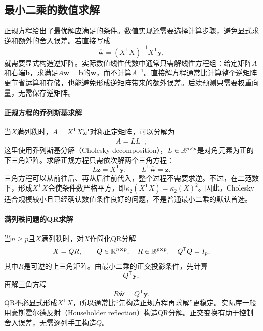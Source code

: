 \subsection{最小二乘的数值求解}
正规方程给出了最优解应满足的条件。数值实现还需要选择计算步骤，避免显式求逆和额外的舍入误差。若直接写成
\begin{equation}
 \hat{\bm w}=(X^{\mathsf T}X)^{-1}X^{\mathsf T}\bm y,
\end{equation}
就需要显式构造逆矩阵。实际数值线性代数中通常只需解线性方程组：给定矩阵$A$和右端$\bm b$，求满足$A\bm w=\bm b$的$\bm w$，而不计算$A^{-1}$。直接解方程通常比计算整个逆矩阵更节省运算和存储，也能避免形成逆矩阵带来的额外误差。后续预测只需要权重向量，无需保存逆矩阵。

\paragraph{正规方程的乔列斯基求解}
当$X$满列秩时，$A=X^{\mathsf T}X$是对称正定矩阵，可以分解为
\begin{equation}
 A=LL^{\mathsf T},
\end{equation}
这里使用乔列斯基分解（Cholesky decomposition），$L\in\mathbb{R}^{p\times p}$是对角元素为正的下三角矩阵。求解正规方程只需依次解两个三角方程：
\begin{equation}
 L\bm z=X^{\mathsf T}\bm y,
 \qquad
 L^{\mathsf T}\hat{\bm w}=\bm z.
\end{equation}
三角方程可以从前往后、再从后往前代入，整个过程不需要求逆。不过，在二范数下，形成$X^{\mathsf T}X$会使条件数严格平方，即$\kappa_2(X^{\mathsf T}X)=\kappa_2(X)^2$。因此，Cholesky适合规模较小且已经确认数值条件良好的问题，不是普通最小二乘的默认首选。

\paragraph{满列秩问题的QR求解}
当$n\geq p$且$X$满列秩时，对$X$作简化QR分解
\begin{equation}
 X=QR,
 \qquad Q\in\mathbb{R}^{n\times p},\quad R\in\mathbb{R}^{p\times p},\quad Q^{\mathsf T}Q=I_p,
\end{equation}
其中$R$是可逆的上三角矩阵。由最小二乘的正交投影条件，先计算
\begin{equation}
 Q^{\mathsf T}\bm y,
\end{equation}
再解三角方程
\begin{equation}
 R\hat{\bm w}=Q^{\mathsf T}\bm y.
\end{equation}
QR不必显式形成$X^{\mathsf T}X$，所以通常比“先构造正规方程再求解”更稳定。实际库一般用豪斯霍尔德反射（Householder reflection）构造QR分解。正交变换有助于控制舍入误差，无需逐列手工构造$Q$。

